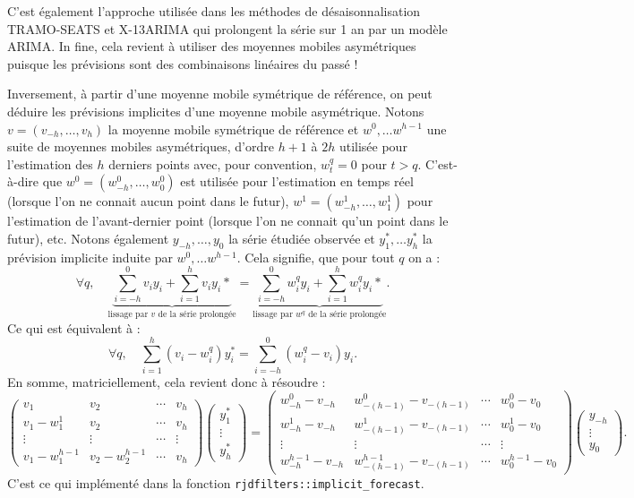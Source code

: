 \documentclass[
  12pt,
  a4paper,french]{article}
\newcommand\1{\mathds{1}}
\begin{document}
C'est également l'approche utilisée dans les méthodes de désaisonnalisation TRAMO-SEATS et X-13ARIMA qui prolongent la série sur 1 an par un modèle ARIMA.
In fine, cela revient à utiliser des moyennes mobiles asymétriques puisque les prévisions sont des combinaisons linéaires du passé !

Inversement, à partir d'une moyenne mobile symétrique de référence, on peut déduire les prévisions implicites d'une moyenne mobile asymétrique.
Notons \(v=(v_{-h},\dots, v_{h})\) la moyenne mobile symétrique de référence et \(w^0,\dots w^{h-1}\) une suite de moyennes mobiles asymétriques, d'ordre \(h+1\) à \(2h\) utilisée pour l'estimation des \(h\) derniers points avec, pour convention, \(w_t^q=0\) pour \(t>q\).
C'est-à-dire que \(w^0=(w_{-h}^0,\dots, w_{0}^0)\) est utilisée pour l'estimation en temps réel (lorsque l'on ne connait aucun point dans le futur), \(w^1=(w_{-h}^1,\dots, w_{1}^1)\) pour l'estimation de l'avant-dernier point (lorsque l'on ne connait qu'un point dans le futur), etc.
Notons également \(y_{-h},\dots,y_{0}\) la série étudiée observée et \(y_{1}^*,\dots y_h^*\) la prévision implicite induite par \(w^0,\dots w^{h-1}\).
Cela signifie, que pour tout \(q\) on a :
\[
\forall q, \quad \underbrace{\sum_{i=-h}^0 v_iy_i + \sum_{i=1}^h v_iy_i*}_{\text{lissage par }v\text{ de la série prolongée}}
=\underbrace{\sum_{i=-h}^0 w_i^qy_i + \sum_{i=1}^h w_i^qy_i*}_{\text{lissage par }w^q\text{ de la série prolongée}}.
\]
Ce qui est équivalent à :
\[
\forall q, \quad \sum_{i=1}^h (v_i- w_i^q) y_i^*
=\sum_{i=-h}^0 (w_i^q-v_i)y_i.
\]
En somme, matriciellement, cela revient donc à résoudre :
\[\scriptstyle
\begin{pmatrix}
  v_1 & v_2 & \cdots & v_h \\
  v_1 - w_1^1 & v_2 & \cdots & v_h \\
  \vdots & \vdots & \cdots & \vdots \\
   v_1 - w_1^{h-1} & v_2-w_2^{h-1} & \cdots & v_h
\end{pmatrix}
\begin{pmatrix}y_1^* \\ \vdots \\ y_h^*\end{pmatrix}=
\begin{pmatrix}
  w_{-h}^0 - v_{-h} & w_{-(h-1)}^0 - v_{-(h-1)} & \cdots & w_{0}^0 - v_{0} \\
  w_{-h}^1 - v_{-h} & w_{-(h-1)}^1 - v_{-(h-1)} & \cdots & w_{0}^1 - v_{0} \\
  \vdots & \vdots & \cdots & \vdots \\
  w_{-h}^{h-1} - v_{-h} & w_{-(h-1)}^{h-1} - v_{-(h-1)} & \cdots & w_{0}^{h-1} - v_{0}
\end{pmatrix}
\begin{pmatrix}y_{-h} \\ \vdots \\ y_0\end{pmatrix}.\]
C'est ce qui implémenté dans la fonction \texttt{rjdfilters::implicit\_forecast}.
\end{document}
